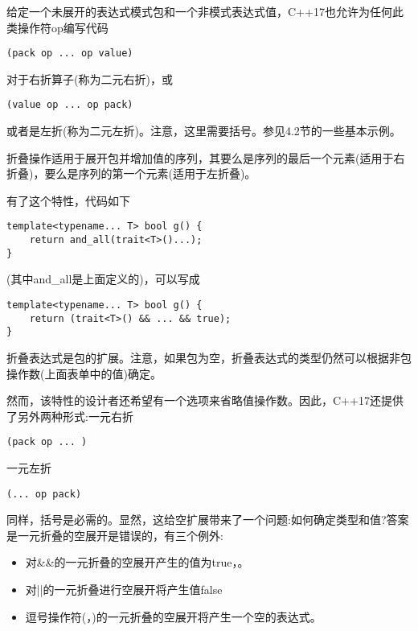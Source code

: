 给定一个未展开的表达式模式包和一个非模式表达式值，C++17也允许为任何此类操作符op编写代码

\begin{lstlisting}[style=styleCXX]
(pack op ... op value)
\end{lstlisting}

对于右折算子(称为二元右折)，或

\begin{lstlisting}[style=styleCXX]
(value op ... op pack)
\end{lstlisting}

或者是左折(称为二元左折)。注意，这里需要括号。参见4.2节的一些基本示例。

折叠操作适用于展开包并增加值的序列，其要么是序列的最后一个元素(适用于右折叠)，要么是序列的第一个元素(适用于左折叠)。

有了这个特性，代码如下

\begin{lstlisting}[style=styleCXX]
template<typename... T> bool g() {
	return and_all(trait<T>()...);
}
\end{lstlisting}

(其中and\_all是上面定义的)，可以写成

\begin{lstlisting}[style=styleCXX]
template<typename... T> bool g() {
	return (trait<T>() && ... && true);
}
\end{lstlisting}

折叠表达式是包的扩展。注意，如果包为空，折叠表达式的类型仍然可以根据非包操作数(上面表单中的值)确定。

然而，该特性的设计者还希望有一个选项来省略值操作数。因此，C++17还提供了另外两种形式:一元右折

\begin{lstlisting}[style=styleCXX]
(pack op ... )
\end{lstlisting}

一元左折

\begin{lstlisting}[style=styleCXX]
(... op pack)
\end{lstlisting}

同样，括号是必需的。显然，这给空扩展带来了一个问题:如何确定类型和值?答案是一元折叠的空展开是错误的，有三个例外:

\begin{itemize}
\item
对\&\&的一元折叠的空展开产生的值为true，。

\item
对||的一元折叠进行空展开将产生值false

\item
逗号操作符(，)的一元折叠的空展开将产生一个空的表达式。
\end{itemize}

